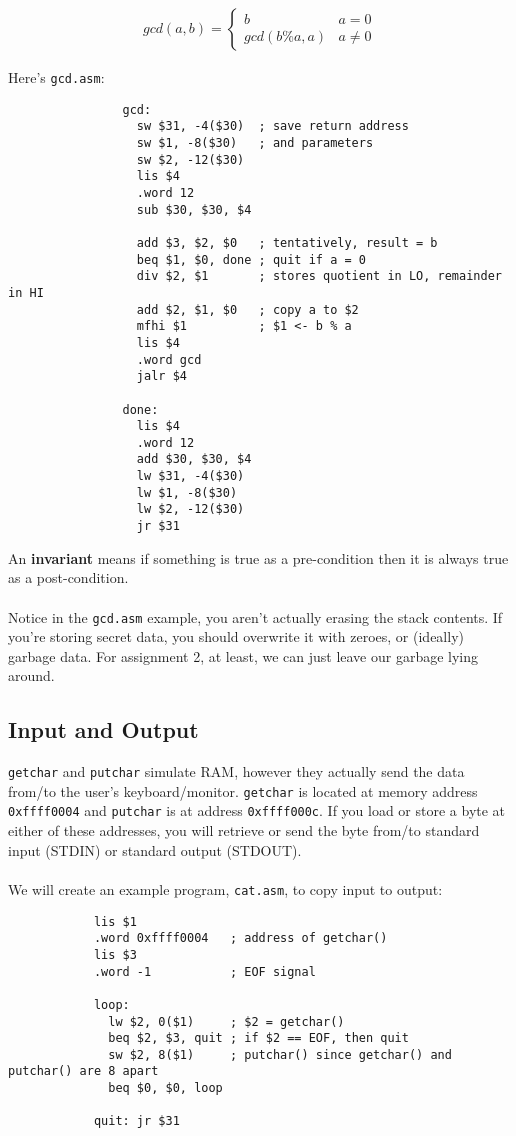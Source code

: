 \documentclass[]{article}
\theoremstyle{definition}
\begin{document}
			\begin{align*}
				gcd(a, b) = \begin{cases}
					b & a = 0 \\
					gcd(b \% a, a) & a \ne 0
				\end{cases}
			\end{align*}
			
			Here's \verb+gcd.asm+:

			\begin{verbatim}
				gcd:
				  sw $31, -4($30)  ; save return address
				  sw $1, -8($30)   ; and parameters
				  sw $2, -12($30)
				  lis $4
				  .word 12
				  sub $30, $30, $4

				  add $3, $2, $0   ; tentatively, result = b
				  beq $1, $0, done ; quit if a = 0
				  div $2, $1       ; stores quotient in LO, remainder in HI
				  add $2, $1, $0   ; copy a to $2
				  mfhi $1          ; $1 <- b % a
				  lis $4
				  .word gcd
				  jalr $4

				done:
				  lis $4
				  .word 12
				  add $30, $30, $4
				  lw $31, -4($30)
				  lw $1, -8($30)
				  lw $2, -12($30)
				  jr $31
			\end{verbatim}

			An \textbf{invariant} means if something is true as a pre-condition then it is always true as a post-condition.
			\\ \\
			Notice in the \verb+gcd.asm+ example, you aren't actually erasing the stack contents. If you're storing secret data, you should overwrite it with zeroes, or (ideally) garbage data. For assignment 2, at least, we can just leave our garbage lying around.
		\subsection{Input and Output}
			\verb+getchar+ and \verb+putchar+ simulate RAM, however they actually send the data from/to the user's keyboard/monitor. \verb+getchar+ is located at memory address \verb+0xffff0004+ and \verb+putchar+ is at address \verb+0xffff000c+. If you load or store a byte at either of these addresses, you will retrieve or send the byte from/to standard input (STDIN) or standard output (STDOUT). 
			\\ \\
			We will create an example program, \verb+cat.asm+, to copy input to output:

			\begin{verbatim}
			lis $1
			.word 0xffff0004   ; address of getchar()
			lis $3
			.word -1           ; EOF signal

			loop:
			  lw $2, 0($1)     ; $2 = getchar()
			  beq $2, $3, quit ; if $2 == EOF, then quit
			  sw $2, 8($1)     ; putchar() since getchar() and putchar() are 8 apart
			  beq $0, $0, loop

			quit: jr $31
			\end{verbatim}
\end{document}
